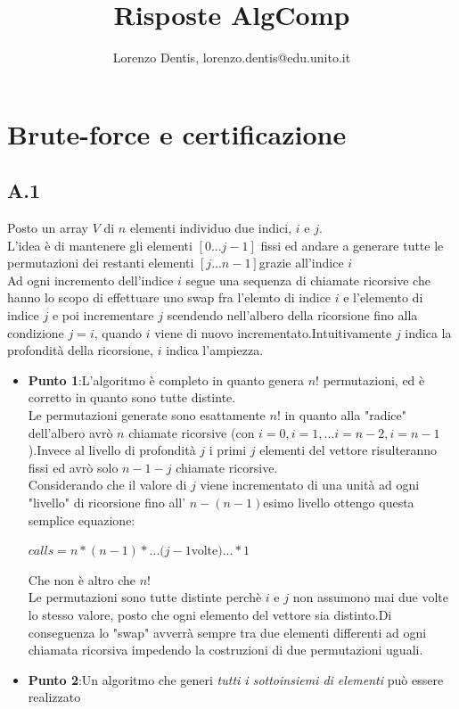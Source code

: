 \documentclass[a4paper]{article}
\begin{document}
\author{Lorenzo Dentis, lorenzo.dentis@edu.unito.it}
\title{Risposte AlgComp}
\maketitle

\section{Brute-force e certificazione}
\subsection{A.1}
Posto un array $V$ di $n$ elementi individuo due indici, $i$ e $j$.\\L'idea è di mantenere gli elementi $[0 ... j-1]$ fissi ed andare a generare tutte le permutazioni dei restanti elementi $[j ... n-1]$grazie all'indice $i$\\Ad ogni incremento dell'indice $i$ segue una sequenza di chiamate ricorsive che hanno lo scopo di effettuare uno swap fra l'elemto di indice $i$ e l'elemento di indice $j$ e poi incrementare $j$ scendendo nell'albero della ricorsione fino alla condizione $j=i$, quando $i$ viene di nuovo incrementato.Intuitivamente $j$ indica la profondità della ricorsione, $i$ indica l'ampiezza.\\
\begin{itemize}
	\item \textbf{Punto 1}:L'algoritmo è completo in quanto genera $n!$ permutazioni, ed è corretto in quanto sono tutte distinte.\\Le permutazioni generate sono esattamente $n!$ in quanto alla "radice" dell'albero avrò $n$ chiamate ricorsive (con $i = 0, i=1, ... i= n-2, i=n-1$ ).Invece al livello di profondità $j$ i primi $j$ elementi del vettore risulteranno fissi ed avrò solo $n-1-j$ chiamate ricorsive.\\Considerando che il valore di $j$ viene incrementato di una unità ad ogni "livello" di ricorsione fino all' $n-(n-1)$esimo livello ottengo questa semplice equazione:\\ \begin{center}$calls = n * (n-1) * ...(j-1$volte$)... * 1$\end{center}Che non è altro che $n!$\\
		Le permutazioni sono tutte distinte perchè $i$ e $j$ non assumono mai due volte lo stesso valore, posto che ogni elemento del vettore sia distinto.Di conseguenza lo "swap" avverrà sempre tra due elementi differenti ad ogni chiamata ricorsiva impedendo la costruzioni di due permutazioni uguali.
	\item \textbf{Punto 2}:Un algoritmo che generi \textit{tutti i sottoinsiemi di elementi} può essere realizzato
\end{itemize}
\end{document}
